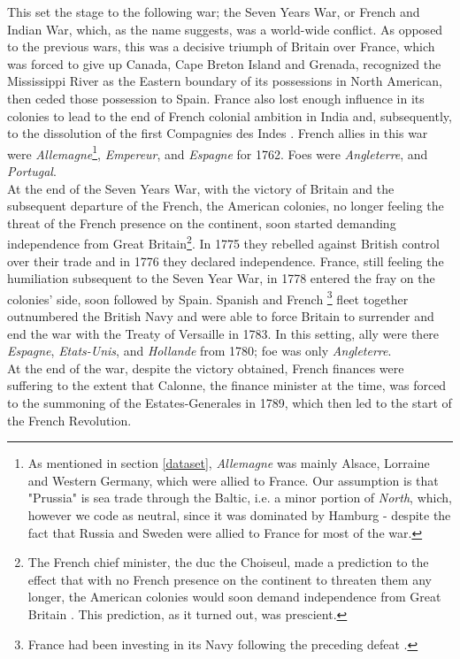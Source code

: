 \documentclass[12pt,a4paper,notitlepage,english]{article}
\begin{document}
This set the stage to the following war; the Seven Years War, or French and Indian War, which, as the name suggests, was a world-wide conflict.
As opposed to the previous wars, this was a decisive triumph of Britain over France, which was forced to give up Canada, Cape Breton Island and Grenada, recognized the Mississippi River as the Eastern boundary of its possessions in North American, then ceded those possession to Spain.
France also lost enough influence in its colonies to lead to the end of French colonial ambition in India and, subsequently, to the dissolution of the first Compagnies des Indes \citep{riley_seven_1986}.
French allies in this war were \textit{Allemagne}\footnote{As mentioned in section \ref{dataset}, \textit{Allemagne} was mainly Alsace, Lorraine and Western Germany, which were allied to France.
Our assumption is that "Prussia" is sea trade through the Baltic, i.e. a minor portion of \textit{North}, which, however we code as neutral, since it was dominated by Hamburg - despite the fact that Russia and Sweden were allied to France for most of the war.}, \textit{Empereur}, and \textit{Espagne} for 1762.
Foes were \textit{Angleterre}, and \textit{Portugal}. \\
At the end of the Seven Years War, with the victory of Britain and the subsequent departure of the French, the American colonies, no longer feeling the threat of the French presence on the continent, soon started demanding independence from Great Britain\footnote{The French chief minister, the duc the Choiseul, made a prediction to the effect that with no French presence on the continent to threaten them any longer, the American colonies would soon demand independence from Great Britain \citep{findlay2009power}.
This prediction, as it turned out, was prescient.}.
In 1775 they rebelled against British control over their trade and in 1776 they declared independence.
France, still feeling the humiliation subsequent to the Seven Year War, in 1778 entered the fray on the colonies' side, soon followed by Spain.
Spanish and French \footnote{France had been investing in its Navy following the preceding defeat \citep{findlay2009power}.} fleet together outnumbered the British Navy and were able to force Britain to surrender and end the war with the Treaty of Versaille in 1783.
In this setting, ally were there \textit{Espagne}, \textit{Etats-Unis}, and \textit{Hollande} from 1780; foe was only \textit{Angleterre}. \\
At the end of the war, despite the victory obtained, French finances were suffering to the extent that Calonne, the finance minister at the time, was forced to the summoning of the Estates-Generales in 1789, which then led to the start of the French Revolution.
\end{document}
